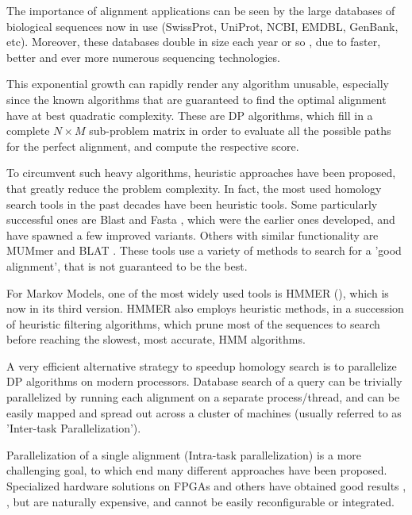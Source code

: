\documentclass[defaultstyle,10pt,master,Helvetica]{thesis}
\begin{document}

The importance of alignment applications can be seen by the large databases of biological sequences now in use (SwissProt, UniProt, NCBI, EMDBL, GenBank, etc). Moreover, these databases double in size each year or so \cite{genbank}, due to faster, better and ever more numerous sequencing technologies.

This exponential growth can rapidly render any algorithm unusable, especially since the known algorithms that are guaranteed to find the optimal alignment have at best quadratic complexity. These are \ac{DP} algorithms, which fill in a complete $N \times M$ sub-problem matrix in order to evaluate all the possible paths for the perfect alignment, and compute the respective score.

To circumvent such heavy algorithms, heuristic approaches have been proposed, that greatly reduce the problem complexity. In fact, the most used homology search tools in the past decades have been heuristic tools. Some particularly successful ones are Blast \cite{blast} and Fasta  \cite{fasta}, which were the earlier ones developed, and have spawned a few improved variants. Others with similar functionality are MUMmer \cite{mummer1} and BLAT \cite{blat}. These tools use a variety of methods to search for a 'good alignment', that is not guaranteed to be the best. 

For Markov Models, one of the most widely used tools is HMMER (\cite{eddy1998profile}), which is now in its third version. HMMER also employs heuristic methods, in a succession of heuristic filtering algorithms, which prune most of the sequences to search before reaching the slowest, most accurate, HMM algorithms. 

A very efficient alternative strategy to speedup homology search is to parallelize \ac{DP} algorithms on modern processors. Database search of a query can be trivially parallelized by running each alignment on a separate process/thread, and can be easily mapped and spread out across a cluster of machines (usually referred to as 'Inter-task Parallelization').

Parallelization of a single alignment (Intra-task parallelization) is a more challenging goal, to which end many different approaches have been proposed. Specialized hardware solutions on FPGAs and others have obtained good results \cite{oliver2005reconfigurable}, \cite{yu2005smith}, but are naturally expensive, and cannot be easily reconfigurable or integrated. 
\end{document}
